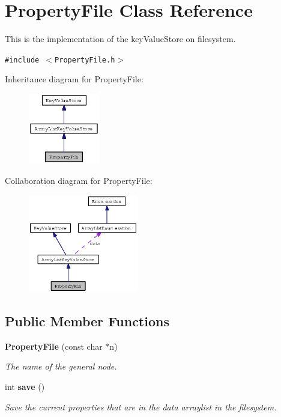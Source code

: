 \section{Property\-File Class Reference}
\label{classPropertyFile}
This is the implementation of the key\-Value\-Store on filesystem.  


{\tt \#include $<$Property\-File.h$>$}

Inheritance diagram for Property\-File:\begin{figure}[H]
\begin{center}
\leavevmode
\includegraphics[width=88pt]{classPropertyFile__inherit__graph}
\end{center}
\end{figure}
Collaboration diagram for Property\-File:\begin{figure}[H]
\begin{center}
\leavevmode
\includegraphics[width=136pt]{classPropertyFile__coll__graph}
\end{center}
\end{figure}
\subsection*{Public Member Functions}
\begin{CompactItemize}
\item 
{\bf Property\-File} (const char $\ast$n)\label{classPropertyFile_90f1d7a2899f43ced063e4aed9d5a7f0}

\begin{CompactList}\small\item\em The name of the general node. \item\end{CompactList}\item 
int {\bf save} ()\label{classPropertyFile_f6258c0d8d6360f4a024384617d4009e}

\begin{CompactList}\small\item\em Save the current properties that are in the data arraylist in the filesystem. \item\end{CompactList}\end{CompactItemize}


